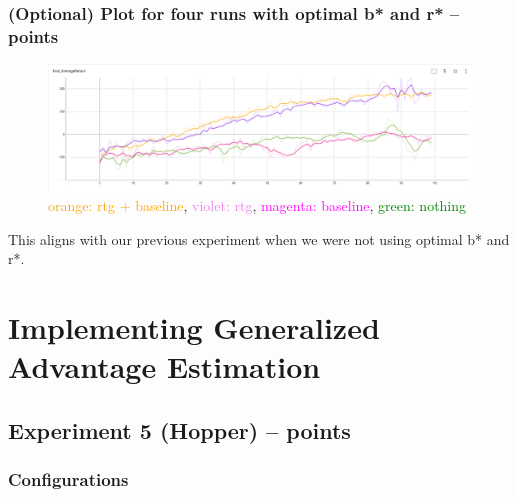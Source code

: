 \documentclass{article}
\begin{document}
\subsubsection{(Optional) Plot for four runs with optimal b* and r* --  points\rbrack}
\begin{answer}[title=Q7.2.7,height=10cm,width=\linewidth]
    \begin{figure}[H]
        \centering
        \includegraphics[width=.99\linewidth]{figs/Q7_half_cheetah_optimal.png}
        \caption{\textcolor{orange}{orange: rtg + baseline}, \textcolor{violet}{violet: rtg}, \textcolor{magenta}{magenta: baseline}, \textcolor{green}{green: nothing}}
    \end{figure}

    This aligns with our previous experiment when we were not using optimal b* and r*.
\end{answer}

\section{Implementing Generalized Advantage Estimation}

\subsection{Experiment 5 (Hopper) --  points\rbrack}

\subsubsection{Configurations}
\end{document}
